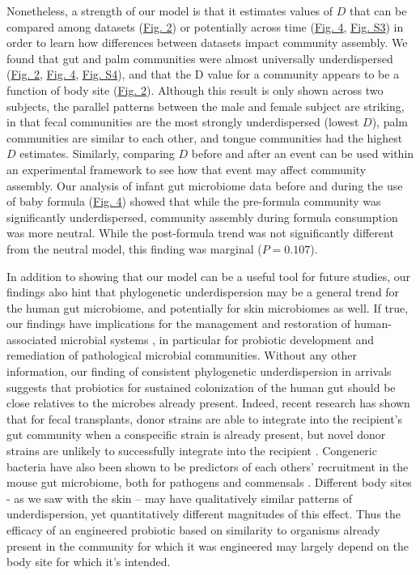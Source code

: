 \documentclass{article}
\begin{document}
\par
Nonetheless, a strength of our model is that it estimates values of \(D\) that can be compared among datasets (\hyperref[sec:figure2]{Fig. 2}) or potentially across time (\hyperref[sec:figure4]{Fig. 4}, \hyperref[sec:figureS3]{Fig. S3}) in order to learn how differences between datasets impact community assembly. We found that gut and palm communities were almost universally underdispersed (\hyperref[sec:figure2]{Fig. 2}, \hyperref[sec:figure4]{Fig. 4}, \hyperref[sec:figureS4]{Fig. S4}), and that the D value for a community appears to be a function of body site (\hyperref[sec:figure2]{Fig. 2}). Although this result is only shown across two subjects, the parallel patterns between the male and female subject are striking, in that fecal communities are the most strongly underdispersed (lowest \(D\)), palm communities are similar to each other, and tongue communities had the highest \(D\) estimates.  Similarly, comparing \(D\) before and after an event can be used within an experimental framework to see how that event may affect community assembly. Our analysis of infant gut microbiome data \cite{Koenig2011} before and during the use of baby formula (\hyperref[sec:figure4]{Fig. 4}) showed that while the pre-formula community was significantly underdispersed, community assembly during formula consumption was more neutral. While the post-formula trend was not significantly different from the neutral model, this finding was marginal (\(P = 0.107\)). 
\par
In addition to showing that our model can be a useful tool for future studies, our findings also hint that phylogenetic underdispersion may be a general trend for the human gut microbiome, and potentially for skin microbiomes as well. If true, our findings have implications for the management and restoration of human-associated microbial systems \cite{Shooner2015}, in particular for probiotic development and remediation of pathological microbial communities. Without any other information, our finding of consistent phylogenetic underdispersion in arrivals suggests that probiotics for sustained colonization of the human gut should be close relatives to the microbes already present. Indeed, recent research has shown that for fecal transplants, donor strains are able to integrate into the recipient's gut community when a conspecific strain is already present, but novel donor strains are unlikely to successfully integrate into the recipient \cite{Li2016}. Congeneric bacteria have also been shown to be predictors of each others' recruitment in the mouse gut microbiome, both for pathogens and commensals \cite{Stecher2010}. Different body sites - as we saw with the skin – may have qualitatively similar patterns of underdispersion, yet quantitatively different magnitudes of this effect. Thus the efficacy of an engineered probiotic based on similarity to organisms already present in the community for which it was engineered may largely depend on the body site for which it's intended.
\end{document}
